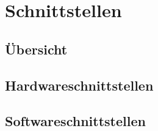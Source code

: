 \section{Schnittstellen}

\subsection{Übersicht}

\subsection{Hardwareschnittstellen}

\subsection{Softwareschnittstellen}
